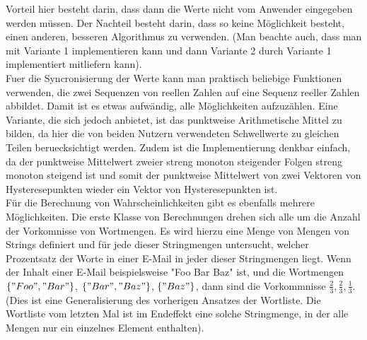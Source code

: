 \documentclass{article}
\theoremstyle{definition}
\theoremstyle{remark}
\begin{document}
Vorteil hier besteht darin, dass dann die Werte nicht vom Anwender eingegeben
werden m\"ussen. Der Nachteil besteht darin, dass so keine M\"oglichkeit besteht,
einen anderen, besseren Algorithmus zu verwenden. (Man beachte auch, dass man
mit Variante 1 implementieren kann und dann Variante 2 durch Variante 1
implementiert mitliefern kann).\\
Fuer die Syncronisierung der Werte kann man praktisch beliebige Funktionen
verwenden, die zwei Sequenzen von reellen Zahlen auf eine Sequenz reeller
Zahlen abbildet. Damit ist es etwas aufw\"andig, alle M\"oglichkeiten
aufzuz\"ahlen. Eine Variante, die sich jedoch anbietet, ist das punktweise
Arithmetische Mittel zu bilden, da hier die von beiden Nutzern verwendeten
Schwellwerte zu gleichen Teilen beruecksichtigt werden. Zudem ist die
Implementierung denkbar einfach, da der punktweise Mittelwert zweier 
streng monoton steigender Folgen streng monoton steigend ist und somit 
der punktweise Mittelwert von zwei Vektoren von Hysteresepunkten wieder
ein Vektor von Hysteresepunkten ist. \\
F\"ur die Berechnung von Wahrscheinlichkeiten gibt es ebenfalls mehrere
M\"oglichkeiten. Die erste Klasse von Berechnungen drehen sich alle um 
die Anzahl der Vorkomnisse von Wortmengen. Es wird hierzu eine Menge von Mengen
von Strings definiert und f\"ur jede dieser Stringmengen untersucht, welcher
Prozentsatz der Worte in einer E-Mail in jeder dieser Stringmengen liegt.
Wenn der Inhalt einer E-Mail beispielsweise "Foo Bar Baz" ist, und die
Wortmengen \(\{"Foo", "Bar"\}\), \(\{"Bar", "Baz"\}\), \(\{"Baz"\}\), dann sind
die Vorkommnisse \(\frac{2}{3}, \frac{2}{3}, \frac{1}{3}\). (Dies ist eine
Generalisierung des vorherigen Ansatzes der Wortliste. Die Wortliste vom
letzten Mal ist im Endeffekt eine solche Stringmenge, in der alle Mengen
nur ein einzelnes Element enthalten).
\(<TODO|Bewertung>\)\\
\(<TODO|Phasendiagramm>\)
\end{document}
